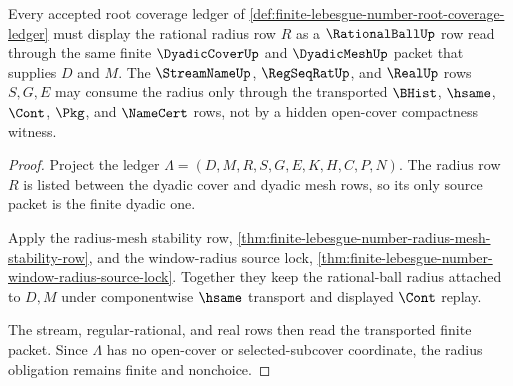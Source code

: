 \begin{theorem}
\label{thm:finite-lebesgue-number-root-dyadic-radius-obligation}
Every accepted root coverage ledger of \autoref{def:finite-lebesgue-number-root-coverage-ledger} must display the rational radius row $R$ as a $\RationalBallUp$ row read through the same finite $\DyadicCoverUp$ and $\DyadicMeshUp$ packet that supplies $D$ and $M$. The $\StreamNameUp$, $\RegSeqRatUp$, and $\RealUp$ rows $S,G,E$ may consume the radius only through the transported $\BHist$, $\hsame$, $\Cont$, $\Pkg$, and $\NameCert$ rows, not by a hidden open-cover compactness witness.
\end{theorem}
\begin{proof}
Project the ledger $\Lambda=(D,M,R,S,G,E,K,H,C,P,N)$. The radius row $R$ is listed between the dyadic cover and dyadic mesh rows, so its only source packet is the finite dyadic one.

Apply the radius-mesh stability row, \autoref{thm:finite-lebesgue-number-radius-mesh-stability-row}, and the window-radius source lock, \autoref{thm:finite-lebesgue-number-window-radius-source-lock}. Together they keep the rational-ball radius attached to $D,M$ under componentwise $\hsame$ transport and displayed $\Cont$ replay.

The stream, regular-rational, and real rows then read the transported finite packet. Since $\Lambda$ has no open-cover or selected-subcover coordinate, the radius obligation remains finite and nonchoice.
\end{proof}

